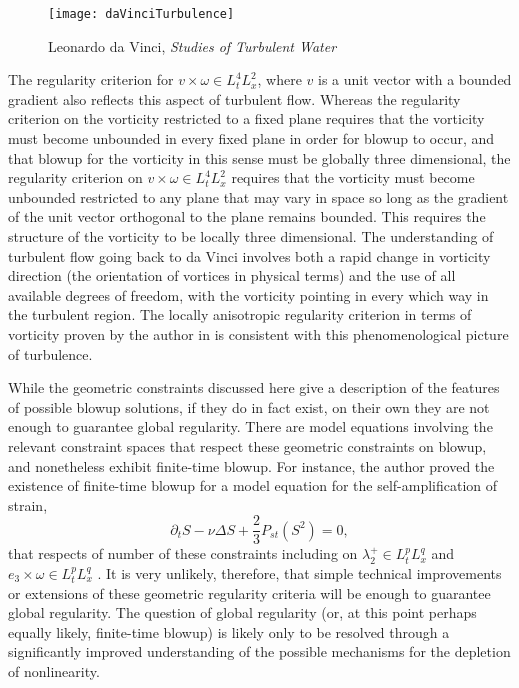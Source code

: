 \documentclass[11pt]{article}
\theoremstyle{plain}
\theoremstyle{remark}
\numberwithin{equation}{section}
\begin{document}
\begin{center}
\begin{figure*}[ht]
    \centering
    \texttt{[image: daVinciTurbulence]}
    \caption{Leonardo da Vinci, \textit{Studies of Turbulent Water}}
\end{figure*}
\end{center}

The regularity criterion for $v\times \omega\in L^4_tL^2_x$, where $v$ is a unit vector with a bounded gradient also reflects this aspect of turbulent flow. Whereas the regularity criterion on the vorticity restricted to a fixed plane requires that the vorticity must become unbounded in every fixed plane in order for blowup to occur, and that blowup for the vorticity in this sense must be globally three dimensional, the regularity criterion on $v\times \omega \in L^4_t L^2_x$ requires that the vorticity must become unbounded restricted to any plane that may vary in space so long as the gradient of the unit vector orthogonal to the plane remains bounded. This requires the structure of the vorticity to be locally three dimensional. The understanding of turbulent flow going back to da Vinci involves both a rapid change in vorticity direction (the orientation of vortices in physical terms) and the use of all available degrees of freedom, with the vorticity pointing in every which way in the turbulent region. The locally anisotropic regularity criterion in terms of vorticity proven by the author in \cite{MillerAnisoVort} is consistent with this phenomenological picture of turbulence.

While the geometric constraints discussed here give a description of the features of possible blowup solutions, if they do in fact exist,
on their own they are not enough to guarantee global regularity. There are model equations involving the relevant constraint spaces that respect these geometric constraints on blowup, and nonetheless exhibit finite-time blowup. For instance, the author proved the existence of finite-time blowup for a model equation for the self-amplification of strain,
\begin{equation}
    \partial_t S -\nu\Delta S
    +\frac{2}{3}P_{st}\left(S^2\right)=0,
\end{equation}
that respects of number of these constraints
including on $\lambda_2^+ \in L^p_t L^q_x$ 
and $e_3 \times \omega \in L^p_t L^q_x$
\cites{MillerStrainModel}.
It is very unlikely, therefore, that simple technical improvements or extensions of these geometric regularity criteria will be enough to guarantee global regularity. The question of global regularity (or, at this point perhaps equally likely, finite-time blowup) is likely only to be resolved through a significantly improved understanding of the possible mechanisms for the depletion of nonlinearity.
\end{document}
